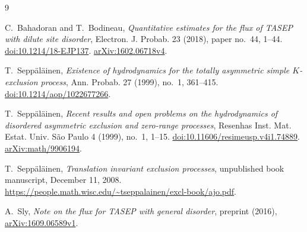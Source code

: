 \documentclass[11pt]{amsart}
\theoremstyle{remark}
\numberwithin{equation}{section}
\begin{document}
\begin{thebibliography}{9}

C.~Bahadoran and T.~Bodineau,
\emph{Quantitative estimates for the flux of TASEP with dilute site disorder},
Electron. J. Probab. \textup{23} (2018), paper no.~44, 1--44.
\href{https://doi.org/10.1214/18-EJP137}{doi:10.1214/18-EJP137}.
\href{https://arxiv.org/abs/1602.06718v4}{arXiv:1602.06718v4}.

T.~Sepp\"al\"ainen,
\emph{Existence of hydrodynamics for the totally asymmetric simple
$K$-exclusion process},
Ann. Probab. \textup{27} (1999), no.~1, 361--415.
\href{https://doi.org/10.1214/aop/1022677266}{doi:10.1214/aop/1022677266}.

T.~Sepp\"al\"ainen,
\emph{Recent results and open problems on the hydrodynamics of disordered
asymmetric exclusion and zero-range processes},
Resenhas Inst. Mat. Estat. Univ. S\~ao Paulo \textup{4} (1999), no.~1, 1--15.
\href{https://doi.org/10.11606/resimeusp.v4i1.74889}{doi:10.11606/resimeusp.v4i1.74889}.
\href{https://arxiv.org/abs/math/9906194}{arXiv:math/9906194}.

T.~Sepp\"al\"ainen,
\emph{Translation invariant exclusion processes},
unpublished book manuscript, December 11, 2008.
\url{https://people.math.wisc.edu/~tseppalainen/excl-book/ajo.pdf}.

A.~Sly,
\emph{Note on the flux for TASEP with general disorder},
preprint (2016), \href{https://arxiv.org/abs/1609.06589v1}{arXiv:1609.06589v1}.

\end{thebibliography}
\end{document}

